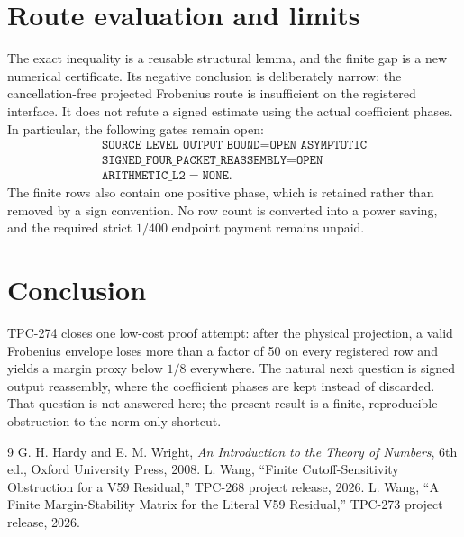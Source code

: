 \documentclass[11pt]{article}
\begin{document}
\section{Route evaluation and limits}

The exact inequality is a reusable structural lemma, and the finite gap is a
new numerical certificate.  Its negative conclusion is deliberately narrow:
the cancellation-free projected Frobenius route is insufficient on the
registered interface.  It does not refute a signed estimate using the actual
coefficient phases.  In particular, the following gates remain open:
\[
 \begin{gathered}
 \texttt{SOURCE\_LEVEL\_OUTPUT\_BOUND}=\texttt{OPEN\_ASYMPTOTIC}\\
 \texttt{SIGNED\_FOUR\_PACKET\_REASSEMBLY}=\texttt{OPEN}\\
 \texttt{ARITHMETIC\_L2}=\texttt{NONE}.
 \end{gathered}
\]
The finite rows also contain one positive phase, which is retained rather than
removed by a sign convention.  No row count is converted into a power saving,
and the required strict \(1/400\) endpoint payment remains unpaid.

\section{Conclusion}

TPC-274 closes one low-cost proof attempt: after the physical projection, a
valid Frobenius envelope loses more than a factor of 50 on every registered
row and yields a margin proxy below \(1/8\) everywhere.  The natural next
question is signed output reassembly, where the coefficient phases are kept
instead of discarded.  That question is not answered here; the present result
is a finite, reproducible obstruction to the norm-only shortcut.

\begin{thebibliography}{9}
G. H. Hardy and E. M. Wright, \emph{An Introduction to the Theory of Numbers},
6th ed., Oxford University Press, 2008.
L. Wang, ``Finite Cutoff-Sensitivity Obstruction for a V59 Residual,'' TPC-268
project release, 2026.
L. Wang, ``A Finite Margin-Stability Matrix for the Literal V59 Residual,''
TPC-273 project release, 2026.
\end{thebibliography}
\end{document}
